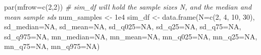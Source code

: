 \documentclass[
  11pt,
  a4paper,
]{book}
\newenvironment{Shaded}{\begin{snugshade}}{\end{snugshade}}
\newcommand{\AttributeTok}[1]{\textcolor[rgb]{0.77,0.63,0.00}{#1}}
\newcommand{\CommentTok}[1]{\textcolor[rgb]{0.56,0.35,0.01}{\textit{#1}}}
\newcommand{\ConstantTok}[1]{\textcolor[rgb]{0.00,0.00,0.00}{#1}}
\newcommand{\DecValTok}[1]{\textcolor[rgb]{0.00,0.00,0.81}{#1}}
\newcommand{\FloatTok}[1]{\textcolor[rgb]{0.00,0.00,0.81}{#1}}
\newcommand{\FunctionTok}[1]{\textcolor[rgb]{0.00,0.00,0.00}{#1}}
\newcommand{\NormalTok}[1]{#1}
\newcommand{\OtherTok}[1]{\textcolor[rgb]{0.56,0.35,0.01}{#1}}
\begin{document}
\begin{Shaded}
\begin{Highlighting}[]
\FunctionTok{par}\NormalTok{(}\AttributeTok{mfrow=}\FunctionTok{c}\NormalTok{(}\DecValTok{2}\NormalTok{,}\DecValTok{2}\NormalTok{))}
\CommentTok{\# sim\_df will hold the sample sizes N, and the median and mean sample sd\textquotesingle{}s }
\NormalTok{num\_samples }\OtherTok{\textless{}{-}} \FloatTok{1e4}
\NormalTok{sim\_df }\OtherTok{\textless{}{-}} \FunctionTok{data.frame}\NormalTok{(}\AttributeTok{N=}\FunctionTok{c}\NormalTok{(}\DecValTok{2}\NormalTok{, }\DecValTok{4}\NormalTok{, }\DecValTok{10}\NormalTok{, }\DecValTok{30}\NormalTok{),}
                     \AttributeTok{sd\_median=}\ConstantTok{NA}\NormalTok{, }\AttributeTok{sd\_mean=}\ConstantTok{NA}\NormalTok{,}
                     \AttributeTok{sd\_q025=}\ConstantTok{NA}\NormalTok{, }\AttributeTok{sd\_q25=}\ConstantTok{NA}\NormalTok{, }\AttributeTok{sd\_q75=}\ConstantTok{NA}\NormalTok{, }\AttributeTok{sd\_q975=}\ConstantTok{NA}\NormalTok{,}
                     \AttributeTok{mn\_median=}\ConstantTok{NA}\NormalTok{, }\AttributeTok{mn\_mean=}\ConstantTok{NA}\NormalTok{,}
                     \AttributeTok{mn\_q025=}\ConstantTok{NA}\NormalTok{, }\AttributeTok{mn\_q25=}\ConstantTok{NA}\NormalTok{, }\AttributeTok{mn\_q75=}\ConstantTok{NA}\NormalTok{, }\AttributeTok{mn\_q975=}\ConstantTok{NA}\NormalTok{) }


\end{Highlighting}
\end{Shaded}
\end{document}

